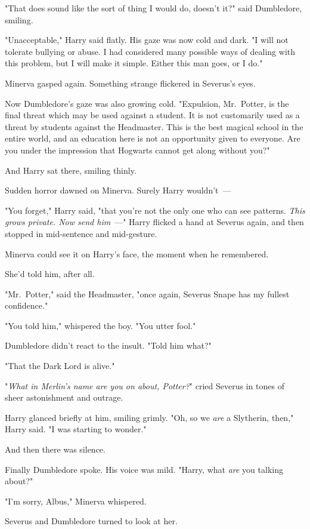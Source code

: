 "That does sound like the sort of thing I would do, doesn't it?" said
Dumbledore, smiling.

"Unacceptable," Harry said flatly. His gaze was now cold and dark. "I will not
tolerate bullying or abuse. I had considered many possible ways of dealing with
this problem, but I will make it simple. Either this man goes, or I do."

Minerva gasped again. Something strange flickered in Severus's eyes.

Now Dumbledore's gaze was also growing cold. "Expulsion, Mr.~Potter, is the
final threat which may be used against a student. It is not customarily used as
a threat by students against the Headmaster. This is the best magical school in
the entire world, and an education here is not an opportunity given to
everyone. Are you under the impression that Hogwarts cannot get along without
you?"

And Harry sat there, smiling thinly.

Sudden horror dawned on Minerva. Surely Harry wouldn't~---

"You forget," Harry said, "that you're not the only one who can see patterns.
\emph{This grows private. Now send him}~---" Harry flicked a hand at Severus
again, and then stopped in mid-sentence and mid-gesture.

Minerva could see it on Harry's face, the moment when he remembered.

She'd told him, after all.

"Mr.~Potter," said the Headmaster, "once again, Severus Snape has my fullest
confidence."

"You told him," whispered the boy. "You utter fool."

Dumbledore didn't react to the insult. "Told him what?"

"That the Dark Lord is alive."

"\emph{What in Merlin's name are you on about, Potter?}" cried Severus in tones
of sheer astonishment and outrage.

Harry glanced briefly at him, smiling grimly. "Oh, so we \emph{are} a
Slytherin, then," Harry said. "I was starting to wonder."

And then there was silence.

Finally Dumbledore spoke. His voice was mild. "Harry, what \emph{are} you
talking about?"

"I'm sorry, Albus," Minerva whispered.

Severus and Dumbledore turned to look at her.

